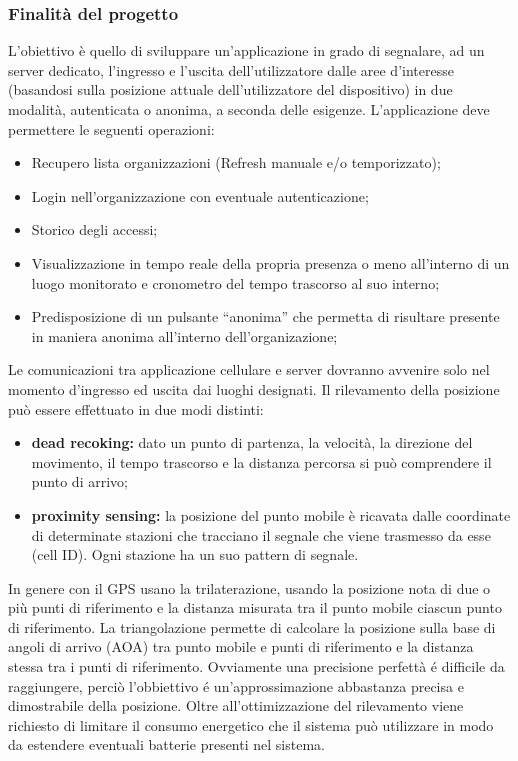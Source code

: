 	\subsubsection{Finalità del progetto}
		L’obiettivo è quello di sviluppare un’applicazione in grado di segnalare, ad un server dedicato, l’ingresso e l’uscita dell’utilizzatore dalle aree d’interesse (basandosi sulla posizione attuale dell'utilizzatore del dispositivo) in due modalità, autenticata o anonima, a seconda delle esigenze.
		L’applicazione deve permettere le seguenti operazioni:
		\begin{itemize}
			\item Recupero lista organizzazioni (Refresh manuale e/o temporizzato);
			\item Login nell’organizzazione con eventuale autenticazione;
			\item Storico degli accessi;
			\item Visualizzazione in tempo reale della propria presenza o meno all’interno di un luogo monitorato e cronometro del tempo trascorso al suo interno;
			\item Predisposizione di un pulsante ``anonima'' che permetta di risultare presente in maniera anonima all'interno dell'organizazione;
		\end{itemize}
		Le comunicazioni tra applicazione cellulare e server dovranno avvenire solo nel momento d'ingresso ed uscita dai luoghi designati. Il rilevamento della posizione può essere effettuato in due modi distinti:
		\begin{itemize}
			\item \textbf{dead recoking:} dato un punto di partenza, la velocità, la direzione del movimento, il tempo trascorso e la distanza percorsa si può comprendere il punto di arrivo;
			\item \textbf{proximity sensing:} la posizione del punto mobile è ricavata dalle coordinate di determinate stazioni che tracciano il segnale che viene trasmesso da esse (cell ID). Ogni stazione ha un suo pattern di segnale.
		\end{itemize}
		In genere con il GPS usano la trilaterazione, usando la posizione nota di due o più punti di riferimento e la distanza misurata tra il punto mobile ciascun punto di riferimento. La triangolazione permette di calcolare la posizione sulla base di angoli di arrivo (AOA) tra punto mobile e punti di riferimento e la distanza stessa tra i punti di riferimento. Ovviamente una precisione perfettà é difficile da raggiungere, perciò l'obbiettivo é un'approssimazione abbastanza precisa e dimostrabile della posizione. Oltre all'ottimizzazione del rilevamento viene richiesto di limitare il consumo energetico che il sistema può utilizzare in modo da estendere eventuali batterie presenti nel sistema.

